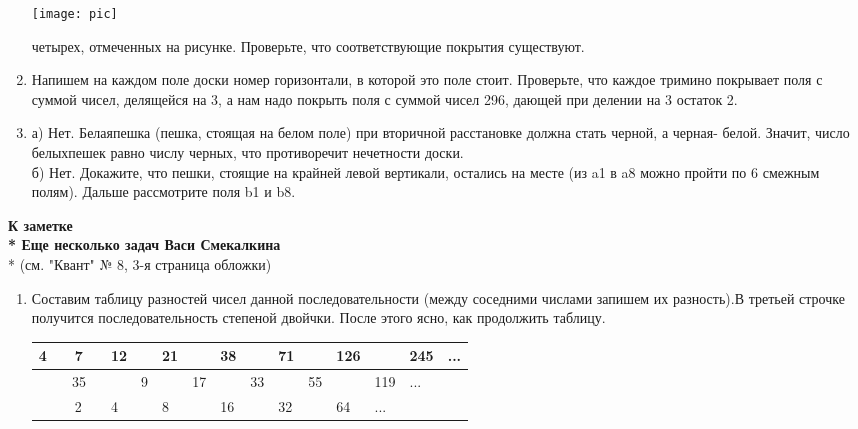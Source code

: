 \begin{multicols}{2}
\begin{enumerate}[label=\textbf{\arabic*.},start=1]
\begin{center}
\texttt{[image: pic]}
\end{center}
четырех, отмеченных на рисунке. Проверьте, что соответствующие покрытия существуют.
\item Напишем на каждом поле доски номер горизонтали, в которой это поле стоит. Проверьте, что каждое тримино покрывает поля с суммой чисел, делящейся на 3, а нам надо покрыть поля с суммой чисел 296, дающей при делении на 3 остаток 2.
\item а) Нет. \flqq Белая\frqq  пешка (пешка, стоящая на белом поле) при вторичной расстановке должна стать \flqq черной\frqq , а \flqq черная\frqq  - \flqq белой\frqq . Значит, число \flqq белых\frqq  пешек равно числу \flqq черных\frqq , что противоречит нечетности доски.\\
\addtolength{\parindent}{1.5cm}
б) Нет. Докажите, что пешки, стоящие на крайней левой вертикали, остались на месте (из a1 в a8 можно пройти по 6 смежным полям). Дальше рассмотрите поля b1 и b8.
\end{enumerate}
\end{multicols}
\begin{center}
\addtolength{\parindent}{1.5cm}
\color{red}
\textbf{
К заметке\\*
\flqq Еще несколько задач Васи Смекалкина\frqq }\\*
(см. "Квант" № 8, 3-я страница обложки)
\end{center}
\begin{enumerate}[label=\textbf{\arabic*.},start=1]
\addtolength{\itemindent}{1.5cm}
\item Составим таблицу разностей чисел данной последовательности (между соседними числами запишем их разность).В третьей строчке получится последовательность степеной двойчки. После этого ясно, как продолжить таблицу.\\
\begin{tabular}{ |p{0.75cm}|p{0.75cm}|p{0.75cm}|p{0.75cm}|p{0.75cm}|p{0.75cm}|p{0.75cm}|p{0.75cm}|p{0.75cm}|p{0.75cm}|p{0.75cm}|p{0.75cm}|p{0.75cm}|p{0.75cm}|p{0.75cm}|p{0.75cm}| }
\hline 
 4&  & 7 &  & 12 & & 21 & & 38 & & \color{blue}71 & & \color{blue}126& &\color{blue}245 &\color{blue}...\\
\hline
  & \multicolumn{3}{c|}{35}&  &9 & & 17 & & \color{blue}33 & &\color{blue} 55 & &\color{blue}119 &\color{blue} ...&\\
\hline
  &  &  2 & &4 & &8 & & \color{blue}16 & &\color{blue}32 & & \color{blue}64  &\color{blue}...& &\\
\hline
\end{tabular}
\end{enumerate}